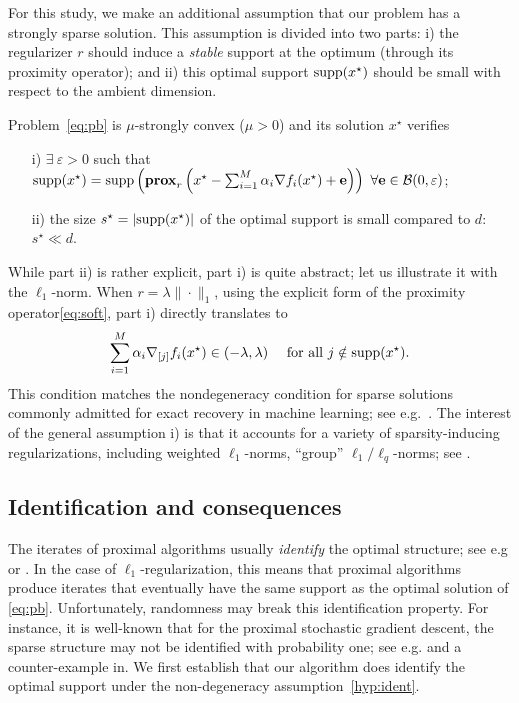 For this study, we make an additional assumption that our problem has a strongly sparse solution. This assumption is divided into two parts: i) the regularizer $r$ should induce a \emph{stable} support at the optimum (through its proximity operator); and ii) this optimal support $\mathrm{supp}(x^\star)$ should be small with respect to the ambient dimension.
\begin{assumption} \label{hyp:ident}
Problem~\eqref{eq:pb} is $\mu$-strongly convex ($\mu>0$) and its solution $x^\star$ verifies
\begin{itemize}
   \item[i)] $\exists~ \varepsilon>0$ such that $\mathrm{supp}(x^\star) = \mathrm{supp} \left( \mathbf{prox}_{r} \left( x^\star - \sum_{i=1}^M  \alpha_i  \nabla f_i(x^\star) + \mathbf{e}   \right)   \right)~ \forall \mathbf{e} \in \mathcal{B}(0,\varepsilon) $;
    \item[ii)] the size $s^\star =|\mathrm{supp}(x^\star)|$ of the optimal support is small compared to $d$: $s^\star\ll d$.
\end{itemize}
\end{assumption}
While part ii) is rather explicit, part i) is quite abstract; let us illustrate it with the $\ell_1$-norm. When $r= \lambda \|\cdot\|_1$, using the explicit form of the proximity operator\;\eqref{eq:soft}, part i) directly translates to
\begin{align*}
   \sum_{i=1}^M  \alpha_i  \nabla_{[j]} f_i(x^\star)  \in (-\lambda,\lambda)  ~~~ \text{ for all } j \notin \mathrm{supp}(x^\star). 
\end{align*}
This condition matches the nondegeneracy condition for sparse solutions commonly admitted for exact recovery in machine learning; see e.g.~\cite{nutini2019active,pmlr-v89-sun19a}.
The interest of the general assumption i) is that it accounts for a variety of sparsity-inducing regularizations, including weighted $\ell_1$-norms, ``group'' $\ell_1/\ell_q$-norms; see \cite[Sec.~3.3]{bach2012optimization}.

\subsection{Identification and consequences} \label{sec:identif}

The iterates of proximal algorithms usually \emph{identify} the optimal structure; see e.g\;\cite{vaiter2015low} or \cite{iutzeler2020SVAA}. In the case of $\ell_1$-regularization, this means that proximal algorithms produce iterates that eventually have the same support as the optimal solution of \eqref{eq:pb}. Unfortunately, randomness may break this identification property. For instance, it is well-known that for the proximal stochastic gradient descent, the sparse structure may not be identified with probability one; see e.g.\;\cite{lee2012manifold} and a counter-example in\;\cite{poon2018local}. We first establish that our algorithm does identify the optimal support under the non-degeneracy assumption~\ref{hyp:ident}.

